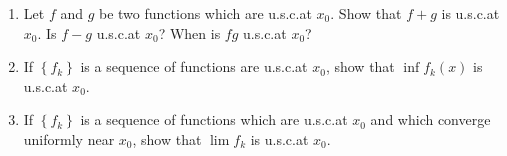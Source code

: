 \begin{problem}
  \hfill
  \begin{enumerate}[label=(\alph*),noitemsep]
  \item Let $f$ and $g$ be two functions which are u.s.c.\@ at $x_0$. Show
    that $f+g$ is u.s.c.\@ at $x_0$. Is $f-g$ u.s.c.\@ at $x_0$? When is
    $fg$ u.s.c.\@ at $x_0$?
  \item If $\left\{f_k\right\}$ is a sequence of functions are u.s.c.\@ at
    $x_0$, show that $\inf f_k(x)$ is u.s.c.\@ at $x_0$.
  \item If $\left\{f_k\right\}$ is a sequence of functions which are
    u.s.c.\@ at $x_0$ and which converge uniformly near $x_0$, show that
    $\lim f_k$ is u.s.c.\@ at $x_0$.
  \end{enumerate}
\end{problem}
